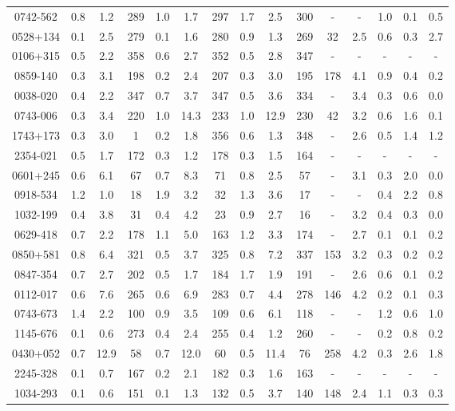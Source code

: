 \begin{table}
\begin{tabular}{ccccccccccccccc}
0742-562 & 0.8 & 1.2 & 289 & 1.0 & 1.7 & 297 & 1.7 & 2.5 & 300 & - & - & 1.0 & 0.1 & 0.5 \\
0528+134 & 0.1 & 2.5 & 279 & 0.1 & 1.6 & 280 & 0.9 & 1.3 & 269 & 32 & 2.5 & 0.6 & 0.3 & 2.7 \\
0106+315 & 0.5 & 2.2 & 358 & 0.6 & 2.7 & 352 & 0.5 & 2.8 & 347 & - & - & - & - & - \\
0859-140 & 0.3 & 3.1 & 198 & 0.2 & 2.4 & 207 & 0.3 & 3.0 & 195 & 178 & 4.1 & 0.9 & 0.4 & 0.2 \\
0038-020 & 0.4 & 2.2 & 347 & 0.7 & 3.7 & 347 & 0.5 & 3.6 & 334 & - & 3.4 & 0.3 & 0.6 & 0.0 \\
0743-006 & 0.3 & 3.4 & 220 & 1.0 & 14.3 & 233 & 1.0 & 12.9 & 230 & 42 & 3.2 & 0.6 & 1.6 & 0.1 \\
1743+173 & 0.3 & 3.0 & 1 & 0.2 & 1.8 & 356 & 0.6 & 1.3 & 348 & - & 2.6 & 0.5 & 1.4 & 1.2 \\
2354-021 & 0.5 & 1.7 & 172 & 0.3 & 1.2 & 178 & 0.3 & 1.5 & 164 & - & - & - & - & - \\
0601+245 & 0.6 & 6.1 & 67 & 0.7 & 8.3 & 71 & 0.8 & 2.5 & 57 & - & 3.1 & 0.3 & 2.0 & 0.0 \\
0918-534 & 1.2 & 1.0 & 18 & 1.9 & 3.2 & 32 & 1.3 & 3.6 & 17 & - & - & 0.4 & 2.2 & 0.8 \\
1032-199 & 0.4 & 3.8 & 31 & 0.4 & 4.2 & 23 & 0.9 & 2.7 & 16 & - & 3.2 & 0.4 & 0.3 & 0.0 \\
0629-418 & 0.7 & 2.2 & 178 & 1.1 & 5.0 & 163 & 1.2 & 3.3 & 174 & - & 2.7 & 0.1 & 0.1 & 0.2 \\
0850+581 & 0.8 & 6.4 & 321 & 0.5 & 3.7 & 325 & 0.8 & 7.2 & 337 & 153 & 3.2 & 0.3 & 0.2 & 0.2 \\
0847-354 & 0.7 & 2.7 & 202 & 0.5 & 1.7 & 184 & 1.7 & 1.9 & 191 & - & 2.6 & 0.6 & 0.1 & 0.2 \\
0112-017 & 0.6 & 7.6 & 265 & 0.6 & 6.9 & 283 & 0.7 & 4.4 & 278 & 146 & 4.2 & 0.2 & 0.1 & 0.3 \\
0743-673 & 1.4 & 2.2 & 100 & 0.9 & 3.5 & 109 & 0.6 & 6.1 & 118 & - & - & 1.2 & 0.6 & 1.0 \\
1145-676 & 0.1 & 0.6 & 273 & 0.4 & 2.4 & 255 & 0.4 & 1.2 & 260 & - & - & 0.2 & 0.8 & 0.2 \\
0430+052 & 0.7 & 12.9 & 58 & 0.7 & 12.0 & 60 & 0.5 & 11.4 & 76 & 258 & 4.2 & 0.3 & 2.6 & 1.8 \\
2245-328 & 0.1 & 0.7 & 167 & 0.2 & 2.1 & 182 & 0.3 & 1.6 & 163 & - & - & - & - & - \\
1034-293 & 0.1 & 0.6 & 151 & 0.1 & 1.3 & 132 & 0.5 & 3.7 & 140 & 148 & 2.4 & 1.1 & 0.3 & 0.3 \\

\end{tabular}
\end{table}
